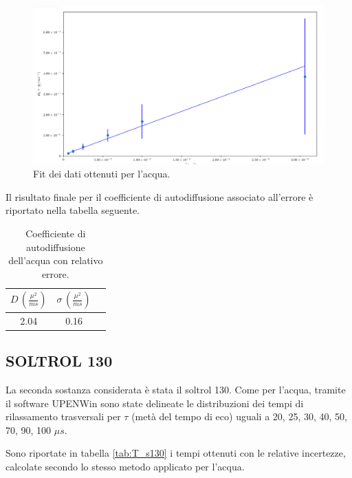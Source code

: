 \begin{figure}[h!]
\centering
\includegraphics[width=\columnwidth]{Figure/H2O_calc.png}
\caption{Fit dei dati ottenuti per l'acqua.}
\label{fig:Df_h2o}
\end{figure}
\newpage
Il risultato finale per il coefficiente di autodiffusione associato all'errore è riportato nella tabella seguente.

\begin{table}[h!]
    \begin{center}
    \begin{tabular}{c c c}
    \toprule
    	$D\,(\frac{{\mu}^2}{ms})$ & $\sigma\,(\frac{{\mu}^2}{ms})$ \\
    \midrule
    	2.04	&	0.16	\\
    \bottomrule
    \end{tabular}
    \caption{Coefficiente di autodiffusione dell'acqua con relativo errore.}
    \label{tab:Df_h2o}
    \end{center}
\end{table}


\subsection*{SOLTROL 130}

La seconda sostanza considerata è stata il soltrol 130.
Come per l'acqua, tramite il software UPENWin sono state delineate le distribuzioni dei tempi di rilassamento trasversali per $\tau$ (metà del tempo di eco) uguali a 20, 25, 30, 40, 50, 70, 90, 100 ${\mu}s$.

Sono riportate in tabella \ref{tab:T_s130} i tempi ottenuti con le relative incertezze, calcolate secondo lo stesso metodo applicato per l'acqua.

